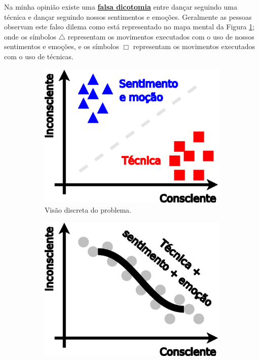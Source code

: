 Na minha opinião existe uma \hyperref[ref:falsadilema]{\textbf{falsa dicotomia}} entre dançar 
seguindo uma técnica e dançar seguindo nossos sentimentos e emoções.
Geralmente as pessoas observam este falso dilema como está representado no mapa mental da
Figura \ref{fig:tecniva-sentimento:a};
onde os símbolos $\bigtriangleup$  representam os movimentos executados com o uso de nossos sentimentos e emoções,
e os símbolos $\Box$ representam os movimentos executados com o uso de técnicas.
\begin{figure}[ht]
\centering
    \begin{subfigure}{.32\textwidth}
      \centering
      \includegraphics[width=.975\linewidth]{chapters/cap-musicalidade-tecnica/tecnica-emotion-1}  
      \caption{Visão discreta do problema.}
      \label{fig:tecniva-sentimento:a}
    \end{subfigure}
    \hfill
    \begin{subfigure}{.32\textwidth}
      \centering
      \includegraphics[width=.975\linewidth]{chapters/cap-musicalidade-tecnica/tecnica-emotion-2}  

\end{subfigure}
\end{figure}
